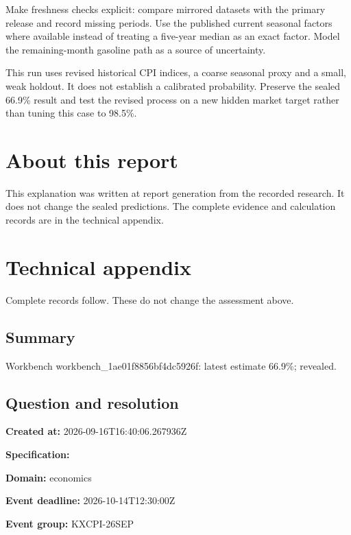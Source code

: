 \documentclass[11pt]{article}
\begin{document}
Make freshness checks explicit: compare mirrored datasets with the primary release and record missing periods. Use the published current seasonal factors where available instead of treating a five-year median as an exact factor. Model the remaining-month gasoline path as a source of uncertainty.


This run uses revised historical CPI indices, a coarse seasonal proxy and a small, weak holdout. It does not establish a calibrated probability. Preserve the sealed 66.9\% result and test the revised process on a new hidden market target rather than tuning this case to 98.5\%.


\section*{\textcolor{epdarkgreen}{About this report}}
This explanation was written at report generation from the recorded research. It does not change the sealed predictions. The complete evidence and calculation records are in the technical appendix.


\clearpage
\appendix
\section{Technical appendix}
Complete records follow. These do not change the assessment above.
\subsection*{\textcolor{epdarkgreen}{Summary}}
Workbench workbench\_1a\hspace{0pt}e01f8856bf4d\hspace{0pt}c5926f: latest estimate 66.9\%; revealed.


\subsection*{\textcolor{epdarkgreen}{Question and resolution}}
\par\noindent\textbf{Created at:} 2026-09-16T16:40:06.267936Z

\par\noindent\textbf{Specification:} \par \par\noindent\textbf{Domain:} economics

\par\noindent\textbf{Event deadline:} 2026-10-14T12:30:00Z

\par\noindent\textbf{Event group:} KXCPI-26SEP
\end{document}
